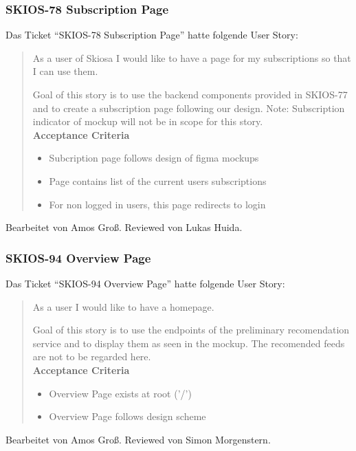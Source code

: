 \subsubsection{SKIOS-78 Subscription Page}
Das Ticket \enquote{SKIOS-78 Subscription Page} hatte folgende User Story:
\begin{quotation}
    As a user of Skiosa I would like to have a page for my subscriptions so that I can use them.

    Goal of this story is to use the backend components provided in SKIOS-77 and to create a subscription page following our design.
    Note: Subscription indicator of mockup will not be in scope for this story. \\

\textbf{Acceptance Criteria}
\begin{itemize}
    \item Subcription page follows design of figma mockups
    \item Page contains list of the current users subscriptions
    \item For non logged in users, this page redirects to login
\end{itemize}
\end{quotation}
Bearbeitet von Amos Groß.
Reviewed von Lukas Huida.

\subsubsection{SKIOS-94 Overview Page}
Das Ticket \enquote{SKIOS-94 Overview Page} hatte folgende User Story:
\begin{quotation}
    As a user I would like to have a homepage.

    Goal of this story is to use the endpoints of the preliminary recomendation service and to display them as seen in the mockup.
    The recomended feeds are not to be regarded here. \\

\textbf{Acceptance Criteria}
\begin{itemize}
    \item Overview Page exists at root ('/')
    \item Overview Page follows design scheme 
\end{itemize}
\end{quotation}
Bearbeitet von Amos Groß.
Reviewed von Simon Morgenstern.

